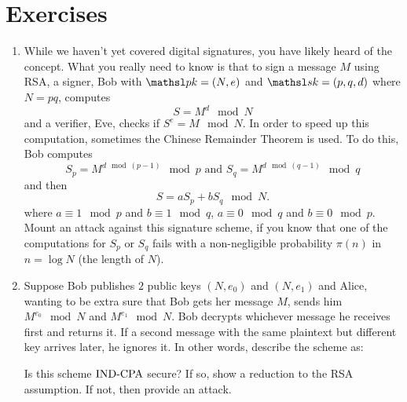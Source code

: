\section*{Exercises}

\begin{enumerate}[label=\textbf{Exercise \thesection.\arabic*}, wide=0pt]
  \item While we haven't yet covered digital signatures, you have likely heard of the concept. What you really need to know is that to sign a message $M$ using RSA, a signer, Bob with $\pk = (N, e)$ and $\sk = (p, q, d)$ where $N = pq$, computes 
  \[
  S = M^d \mod N
  \]
  and a verifier, Eve, checks if $S^e = M\mod N$. In order to speed up this computation, sometimes the Chinese Remainder Theorem is used. To do this, Bob computes
  \[
  S_p = M^{d\mod (p-1)} \mod p \text{ and } S_q = M^{d\mod (q-1)} \mod q
  \]
  and then 
  \[
  S = aS_p + bS_q \mod N.
  \]
  where $a \equiv 1\mod p$ and $b \equiv 1 \mod q$, $a \equiv 0\mod q$ and $b \equiv 0 \mod p$.
  Mount an attack against this signature scheme, if you know that one of the computations for $S_p$ or $S_q$ fails with a non-negligible probability $\pi(n)$ in $n = \log N$ (the length of $N$). 
  \item Suppose Bob publishes $2$ public keys $(N, e_0)$ and $(N, e_1)$ and Alice, wanting to be extra sure that Bob gets her message $M$, sends him $M^{e_0}\mod N$ and $M^{e_1}\mod N$. Bob decrypts whichever message he receives first and returns it. If a second message with the same plaintext but different key arrives later, he ignores it. In other words, describe the scheme as:
  \begin{center}
\end{center} 
Is this scheme $\textnormal{IND-CPA}$ secure? If so, show a reduction to the RSA assumption. If not, then provide an attack.
  
\end{enumerate}


%
%
%
%

